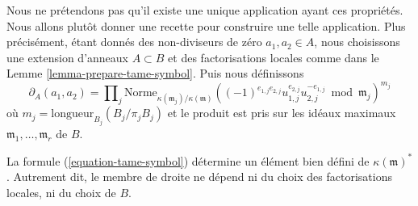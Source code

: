 \medskip\noindent
Nous ne prétendons pas qu'il existe une unique application ayant ces propriétés.
Nous allons plutôt donner une recette pour construire une telle application.
Plus précisément, étant donnés des non-diviseurs de zéro $a_1, a_2 \in A$, nous choisissons
une extension d'anneaux $A \subset B$ et des factorisations locales
comme dans le Lemme \ref{lemma-prepare-tame-symbol}.
Puis nous définissons
\begin{equation}
\label{equation-tame-symbol}
\partial_A(a_1, a_2) = \prod\nolimits_j
\text{Norme}_{\kappa(\mathfrak m_j)/\kappa(\mathfrak m)}
((-1)^{e_{1, j}e_{2, j}}u_{1, j}^{e_{2, j}}u_{2, j}^{-e_{1, j}}
\bmod \mathfrak m_j)^{m_j}
\end{equation}
où $m_j = \text{longueur}_{B_j}(B_j/\pi_j B_j)$ et le produit
est pris sur les idéaux maximaux $\mathfrak m_1, \ldots, \mathfrak m_r$ de $B$.

\begin{lemma}
\label{lemma-well-defined-tame-symbol}
La formule (\ref{equation-tame-symbol}) détermine un
élément bien défini de $\kappa(\mathfrak m)^*$. Autrement dit, le
membre de droite ne dépend ni du choix des
factorisations locales, ni du choix de $B$.
\end{lemma}

